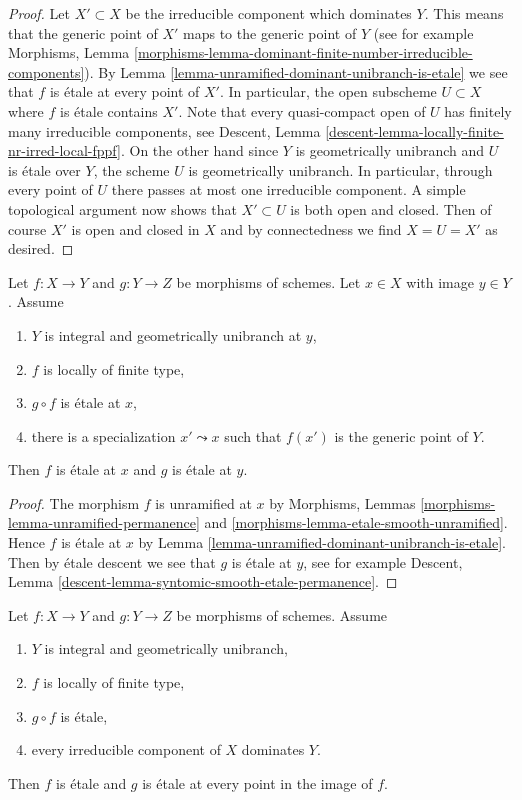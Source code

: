 \begin{proof}
Let $X' \subset X$ be the irreducible component which dominates $Y$.
This means that the generic point of $X'$ maps to the generic point of $Y$
(see for example Morphisms, Lemma
\ref{morphisms-lemma-dominant-finite-number-irreducible-components}).
By Lemma \ref{lemma-unramified-dominant-unibranch-is-etale}
we see that $f$ is \'etale at every point of $X'$. In particular,
the open subscheme $U \subset X$ where $f$ is \'etale contains $X'$.
Note that every quasi-compact open of $U$ has finitely many irreducible
components, see
Descent, Lemma \ref{descent-lemma-locally-finite-nr-irred-local-fppf}.
On the other hand since $Y$ is geometrically unibranch and $U$ is \'etale
over $Y$, the scheme $U$ is geometrically unibranch. In particular, through
every point of $U$ there passes at most one irreducible component.
A simple topological argument now shows that $X' \subset U$
is both open and closed. Then of course $X'$ is open and closed in $X$ and by
connectedness we find $X = U = X'$ as desired.
\end{proof}

\begin{lemma}
\label{lemma-weird-permanence-etale}
Let $f : X \to Y$ and $g : Y \to Z$ be morphisms of schemes.
Let $x \in X$ with image $y \in Y$. Assume
\begin{enumerate}
\item $Y$ is integral and geometrically unibranch at $y$,
\item $f$ is locally of finite type,
\item $g \circ f$ is \'etale at $x$,
\item there is a specialization $x' \leadsto x$ such that $f(x')$
is the generic point of $Y$.
\end{enumerate}
Then $f$ is \'etale at $x$ and $g$ is \'etale at $y$.
\end{lemma}

\begin{proof}
The morphism $f$ is unramified at $x$ by Morphisms, Lemmas
\ref{morphisms-lemma-unramified-permanence}
and \ref{morphisms-lemma-etale-smooth-unramified}.
Hence $f$ is \'etale at $x$ by
Lemma \ref{lemma-unramified-dominant-unibranch-is-etale}.
Then by \'etale descent we see that $g$ is \'etale at $y$, see
for example Descent, Lemma
\ref{descent-lemma-syntomic-smooth-etale-permanence}.
\end{proof}

\begin{lemma}
\label{lemma-global-weird-permanence-etale}
Let $f : X \to Y$ and $g : Y \to Z$ be morphisms of schemes.
Assume
\begin{enumerate}
\item $Y$ is integral and geometrically unibranch,
\item $f$ is locally of finite type,
\item $g \circ f$ is \'etale,
\item every irreducible component of $X$ dominates $Y$.
\end{enumerate}
Then $f$ is \'etale and $g$ is \'etale at every point in
the image of $f$.
\end{lemma}

